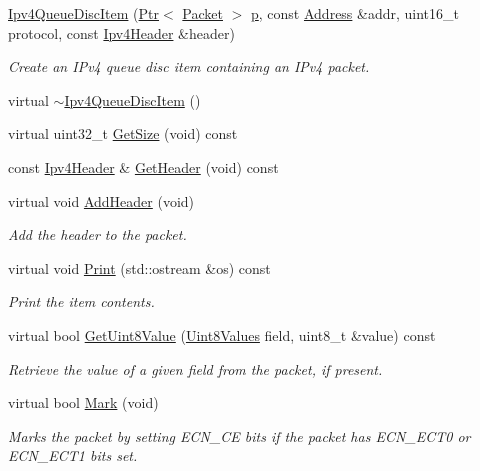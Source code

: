\begin{DoxyCompactItemize}
\item 
\hyperlink{classns3_1_1Ipv4QueueDiscItem_a8cad83a03d0e2a1d32950a9907f0fd5b}{Ipv4\+Queue\+Disc\+Item} (\hyperlink{classns3_1_1Ptr}{Ptr}$<$ \hyperlink{classns3_1_1Packet}{Packet} $>$ \hyperlink{lte__link__budget__x2__handover__measures_8m_ac9de518908a968428863f829398a4e62}{p}, const \hyperlink{classns3_1_1Address}{Address} \&addr, uint16\+\_\+t protocol, const \hyperlink{classns3_1_1Ipv4Header}{Ipv4\+Header} \&header)
\begin{DoxyCompactList}\small\item\em Create an I\+Pv4 queue disc item containing an I\+Pv4 packet. \end{DoxyCompactList}\item 
virtual \hyperlink{classns3_1_1Ipv4QueueDiscItem_a1428ef73f847f80c91753a0c04b5135a}{$\sim$\+Ipv4\+Queue\+Disc\+Item} ()
\item 
virtual uint32\+\_\+t \hyperlink{classns3_1_1Ipv4QueueDiscItem_ab0b7c3e15ec65512d5a2834594203b3e}{Get\+Size} (void) const 
\item 
const \hyperlink{classns3_1_1Ipv4Header}{Ipv4\+Header} \& \hyperlink{classns3_1_1Ipv4QueueDiscItem_a147949043a9565477f7526d17a58e8d6}{Get\+Header} (void) const 
\item 
virtual void \hyperlink{classns3_1_1Ipv4QueueDiscItem_a935709924d746dddbdc4d82e7a4a751d}{Add\+Header} (void)
\begin{DoxyCompactList}\small\item\em Add the header to the packet. \end{DoxyCompactList}\item 
virtual void \hyperlink{classns3_1_1Ipv4QueueDiscItem_a5d4a841fa193617619f509330299cf08}{Print} (std\+::ostream \&os) const 
\begin{DoxyCompactList}\small\item\em Print the item contents. \end{DoxyCompactList}\item 
virtual bool \hyperlink{classns3_1_1Ipv4QueueDiscItem_ac754d98d38143b576747ab53971e34c7}{Get\+Uint8\+Value} (\hyperlink{classns3_1_1QueueItem_a9be6c7d46929336179fe00c3224eec9f}{Uint8\+Values} field, uint8\+\_\+t \&value) const 
\begin{DoxyCompactList}\small\item\em Retrieve the value of a given field from the packet, if present. \end{DoxyCompactList}\item 
virtual bool \hyperlink{classns3_1_1Ipv4QueueDiscItem_aed2df9ac4378c525656e4f6bae2a3757}{Mark} (void)
\begin{DoxyCompactList}\small\item\em Marks the packet by setting E\+C\+N\+\_\+\+CE bits if the packet has E\+C\+N\+\_\+\+E\+C\+T0 or E\+C\+N\+\_\+\+E\+C\+T1 bits set. \end{DoxyCompactList}\end{DoxyCompactItemize}
